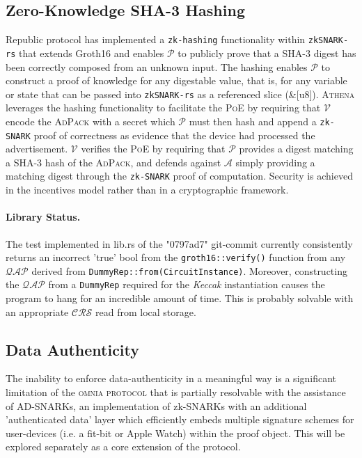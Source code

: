 \documentclass{article}
\begin{document}
			\subsection{Zero-Knowledge SHA-3 Hashing}
			
				Republic protocol has implemented a \texttt{zk-hashing} functionality within \texttt{zkSNARK-rs} that extends Groth16 and enables $\mathcal{P}$ to publicly prove that a SHA-3 digest has been correctly composed from an unknown input. The hashing enables $\mathcal{P}$ to construct a proof of knowledge for any digestable value, that is, for any variable or state that can be passed into \texttt{zkSNARK-rs} as a referenced slice (\&[u8]). \textsc{Athena} leverages the hashing functionality to facilitate the \textsc{PoE} by requiring that $\mathcal{V}$ encode the \textsc{AdPack} with a secret which $\mathcal{P}$ must then hash and append a \texttt{zk-SNARK} proof of correctness as evidence that the device had processed the advertisement. $\mathcal{V}$ verifies the \textsc{PoE} by requiring that $\mathcal{P}$ provides a digest matching a SHA-3 hash of the \textsc{AdPack}, and defends against $\mathcal{A}$ simply providing a matching digest through the \texttt{zk-SNARK} proof of computation. Security is achieved in the incentives model rather than in a cryptographic framework.
						
				\paragraph{Library Status.} The test implemented in lib.rs of the "0797ad7" git-commit currently consistently returns an incorrect 'true' bool from the \texttt{groth16::verify()} function from any $\mathcal{QAP}$ derived from \texttt{DummyRep::from(CircuitInstance)}. Moreover, constructing the $\mathcal{QAP}$ from a \texttt{DummyRep} required for the \textit{Keccak} instantiation causes the program to hang for an incredible amount of time. This is probably solvable with an appropriate $\mathcal{CRS}$ read from local storage.
			
			\subsection{Data Authenticity}
			
				The inability to enforce data-authenticity in a meaningful way is a significant limitation of the \textsc{omnia protocol} that is partially resolvable with the assistance of AD-SNARKs, an implementation of zk-SNARKs with an additional 'authenticated data' layer which efficiently embeds multiple signature schemes for user-devices (i.e. a fit-bit or Apple Watch) within the proof object. This will be explored separately as a core extension of the protocol.
					

				
		
\end{document}

